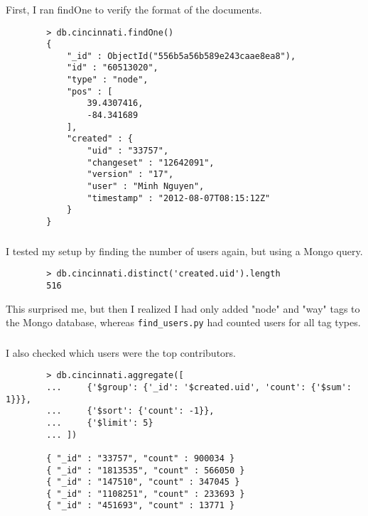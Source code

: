 \documentclass{article}
\begin{document}
        \subsubsection{}
        First, I ran findOne to verify the format of the documents.

        \begin{lstlisting}
        > db.cincinnati.findOne()
        {
            "_id" : ObjectId("556b5a56b589e243caae8ea8"),
            "id" : "60513020",
            "type" : "node",
            "pos" : [
                39.4307416,
                -84.341689
            ],
            "created" : {
                "uid" : "33757",
                "changeset" : "12642091",
                "version" : "17",
                "user" : "Minh Nguyen",
                "timestamp" : "2012-08-07T08:15:12Z"
            }
        }
        \end{lstlisting}

        \subsubsection{}
        I tested my setup by finding the number of users again, but using
        a Mongo query.

        \begin{lstlisting}
        > db.cincinnati.distinct('created.uid').length
        516
        \end{lstlisting}

        This surprised me, but then I realized I had only added "node" and "way"
        tags to the Mongo database, whereas \texttt{find\_users.py} had counted
        users for all tag types.

        \subsubsection{}
        I also checked which users were the top contributors.

        \begin{lstlisting}
        > db.cincinnati.aggregate([
        ...     {'$group': {'_id': '$created.uid', 'count': {'$sum': 1}}},
        ...     {'$sort': {'count': -1}},
        ...     {'$limit': 5}
        ... ])

        { "_id" : "33757", "count" : 900034 }
        { "_id" : "1813535", "count" : 566050 }
        { "_id" : "147510", "count" : 347045 }
        { "_id" : "1108251", "count" : 233693 }
        { "_id" : "451693", "count" : 13771 }
        \end{lstlisting}
\end{document}
